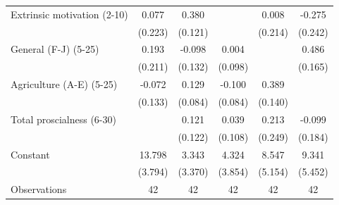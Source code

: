 {\begin{tabular}{l*{5}{c}}
Extrinsic motivation (2-10)&0.077         &0.380\sym{***}&              &0.008         &-0.275         \\
                    &(0.223)         &(0.121)         &              &(0.214)         &(0.242)         \\
General (F-J) (5-25)&0.193         &-0.098         &0.004         &              &0.486\sym{***}\\
                    &(0.211)         &(0.132)         &(0.098)         &              &(0.165)         \\
Agriculture (A-E) (5-25)&-0.072         &0.129         &-0.100         &0.389\sym{***}&              \\
                    &(0.133)         &(0.084)         &(0.084)         &(0.140)         &              \\
Total proscialness (6-30)&              &0.121         &0.039         &0.213         &-0.099         \\
                    &              &(0.122)         &(0.108)         &(0.249)         &(0.184)         \\
Constant            &13.798\sym{***}&3.343         &4.324         &8.547         &9.341\sym{*}  \\
                    &(3.794)         &(3.370)         &(3.854)         &(5.154)         &(5.452)         \\
\hline
Observations        &   42         &   42         &   42         &   42         &   42         \\
\hline\hline
\end{tabular}
}
